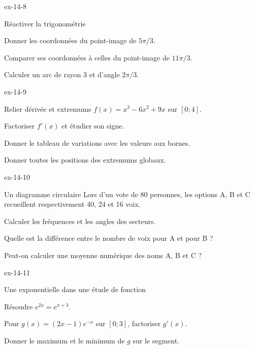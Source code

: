 \begin{blocLivre}{ex-14-8}
\begin{exercice}[2]{Réactiver la trigonométrie}
\begin{questions}
\item Donner les coordonnées du point-image de $5\pi/3$.
\item Comparer ses coordonnées à celles du point-image de $11\pi/3$.
\item Calculer un arc de rayon 3 et d’angle $2\pi/3$.
\end{questions}
\end{exercice}
\end{blocLivre}
\begin{blocLivre}{ex-14-9}
\begin{exercice}[2]{Relier dérivée et extremums}
$f(x)=x^3-6x^2+9x$ sur $[0;4]$.\begin{questions}
\item Factoriser $f\prime(x)$ et étudier son signe.
\item Donner le tableau de variations avec les valeurs aux bornes.
\item Donner toutes les positions des extremums globaux.
\end{questions}
\end{exercice}
\end{blocLivre}
\begin{blocLivre}{ex-14-10}
\begin{exercice}[2]{Un diagramme circulaire}
Lors d’un vote de 80 personnes, les options A, B et C recueillent respectivement 40, 24 et 16 voix.\begin{questions}
\item Calculer les fréquences et les angles des secteurs.
\item Quelle est la différence entre le nombre de voix pour A et pour B ?
\item Peut-on calculer une moyenne numérique des noms A, B et C ?
\end{questions}
\label{figlivre-r14-10-secteurs-ex}

\end{exercice}
\end{blocLivre}
\begin{blocLivre}{ex-14-11}
\begin{exercice}[2]{Une exponentielle dans une étude de fonction}
\begin{questions}
\item Résoudre $e^{2x}=e^{x+3}$.
\item Pour $g(x)=(2x-1)e^{-x}$ sur $[0;3]$, factoriser $g\prime(x)$.
\item Donner le maximum et le minimum de $g$ sur le segment.
\end{questions}
\end{exercice}
\end{blocLivre}
